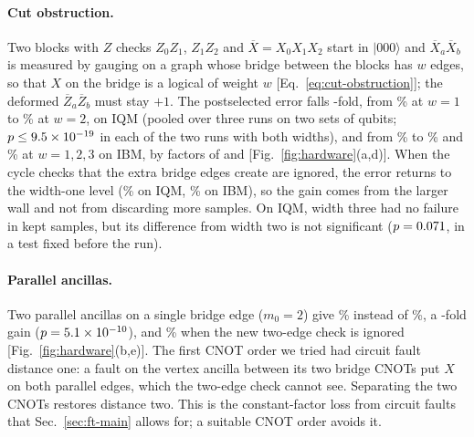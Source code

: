 \paragraph{Cut obstruction.}
Two blocks with $Z$ checks $Z_0Z_1$, $Z_1Z_2$ and
$\overline X=X_0X_1X_2$ start in $|000\rangle$ and $\overline X_a\overline
X_b$ is measured by gauging on a graph whose bridge between the blocks has
$w$ edges, so that $X$ on the bridge is a logical of weight $w$
[Eq.~\eqref{eq:cut-obstruction}]; the deformed $\overline Z_a\overline Z_b$
must stay $+1$.  The postselected error falls \hwIQMfold-fold, from
\hwIQMwOne\% at $w=1$ to \hwIQMwTwo\% at $w=2$, on IQM (pooled over three runs
on two sets of qubits; $p\le9.5\times10^{-19}$ in each of the two runs with both
widths), and from \hwIBMwOne\% to \hwIBMwTwo\% and \hwIBMwThree\% at
$w=1,2,3$ on IBM, by factors of \hwIBMfoldOneTwo{} and \hwIBMfoldTwoThree{}
[Fig.~\ref{fig:hardware}(a,d)].  When the cycle checks that the extra bridge
edges create are ignored, the error returns to the width-one level
(\hwIQMctrl\% on IQM, \hwIBMctrl\% on IBM), so the gain comes from the larger
wall and not from discarding more samples.  On IQM, width three had no
failure in \hwIQMwThreeKept{} kept samples, but its difference from width two
is not significant ($p=0.071$, in a test fixed before the run).

\paragraph{Parallel ancillas.}
Two parallel ancillas on a single bridge edge ($m_0=2$) give \hwMult\%
instead of \hwIQMwOne\%, a \hwMultFold-fold gain ($p=5.1\times10^{-10}$), and
\hwMultCtrl\% when the new two-edge check is ignored
[Fig.~\ref{fig:hardware}(b,e)].  The first CNOT order we tried had circuit
fault distance one: a fault on the vertex ancilla between its two bridge
CNOTs put $X$ on both parallel edges, which the two-edge check cannot see.
Separating the two CNOTs restores distance two.  This is the constant-factor
loss from circuit faults that Sec.~\ref{sec:ft-main} allows for; a suitable
CNOT order avoids it.

